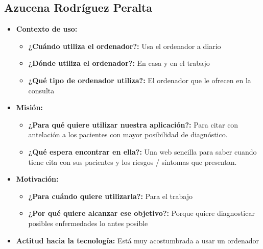 \subsection{Azucena Rodríguez Peralta}
\begin{itemize}
    \item \textbf{Contexto de uso: }
          \begin{itemize}
              \item \textbf{¿Cuándo utiliza el ordenador?: }  Usa el ordenador a diario
              \item \textbf{¿Dónde utiliza el ordenador?: } En casa y en el trabajo
              \item \textbf{¿Qué tipo de ordenador utiliza?: } El ordenador que le ofrecen en la consulta
          \end{itemize}
    \item \textbf{Misión: }
          \begin{itemize}
              \item \textbf{¿Para qué quiere utilizar nuestra aplicación?: } Para citar con antelación a los pacientes con mayor posibilidad de diagnóstico.
              \item \textbf{¿Qué espera encontrar en ella?: } Una web sencilla para saber cuando tiene cita con sus pacientes y los riesgos / síntomas que presentan.
          \end{itemize}
    \item \textbf{Motivación: }
          \begin{itemize}
              \item \textbf{¿Para cuándo quiere utilizarla?: } Para el trabajo
              \item \textbf{¿Por qué quiere alcanzar ese objetivo?: } Porque quiere diagnosticar posibles enfermedades lo antes posible
          \end{itemize}
    \item \textbf{Actitud hacia la tecnología: } Está muy acostumbrada a usar un ordenador
\end{itemize}

